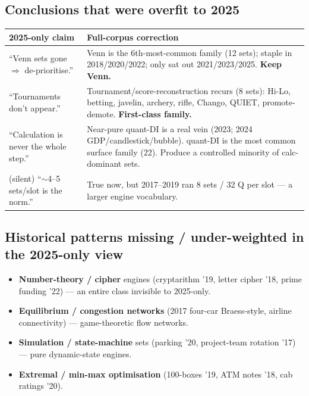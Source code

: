 \documentclass[11pt,a4paper]{article}
\begin{document}
\subsection{Conclusions that were overfit to 2025}
\begin{center}
\begin{tabularx}{\textwidth}{YY}
\toprule
\textbf{2025-only claim} & \textbf{Full-corpus correction} \\
\midrule
``Venn sets gone $\Rightarrow$ de-prioritise.'' & Venn is the 6th-most-common family (12 sets); staple in 2018/2020/2022; only sat out 2021/2023/2025. \textbf{Keep Venn.} \\
``Tournaments don't appear.'' & Tournament/score-reconstruction recurs (8 sets): Hi-Lo, betting, javelin, archery, rifle, Chango, QUIET, promote-demote. \textbf{First-class family.} \\
``Calculation is never the whole step.'' & Near-pure quant-DI is a real vein (2023; 2024 GDP/candlestick/bubble). quant-DI is the most common surface family (22). Produce a controlled minority of calc-dominant sets. \\
(silent) ``$\sim$4--5 sets/slot is the norm.'' & True now, but 2017--2019 ran 8 sets / 32 Q per slot --- a larger engine vocabulary. \\
\bottomrule
\end{tabularx}
\end{center}

\subsection{Historical patterns missing / under-weighted in the 2025-only view}
\begin{itemize}[leftmargin=1.4em]
\item \textbf{Number-theory / cipher} engines (cryptarithm ’19, letter cipher ’18, prime funding ’22) --- an entire class invisible to 2025-only.
\item \textbf{Equilibrium / congestion networks} (2017 four-car Braess-style, airline connectivity) --- game-theoretic flow networks.
\item \textbf{Simulation / state-machine} sets (parking ’20, project-team rotation ’17) --- pure dynamic-state engines.
\item \textbf{Extremal / min-max optimisation} (100-boxes ’19, ATM notes ’18, cab ratings ’20).
\end{itemize}
\end{document}
